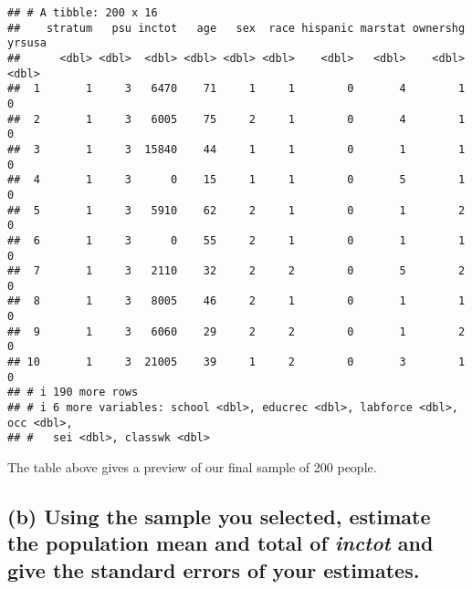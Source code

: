 \documentclass[]{article}
\begin{document}
\begin{verbatim}
## # A tibble: 200 x 16
##    stratum   psu inctot   age   sex  race hispanic marstat ownershg yrsusa
##      <dbl> <dbl>  <dbl> <dbl> <dbl> <dbl>    <dbl>   <dbl>    <dbl>  <dbl>
##  1       1     3   6470    71     1     1        0       4        1      0
##  2       1     3   6005    75     2     1        0       4        1      0
##  3       1     3  15840    44     1     1        0       1        1      0
##  4       1     3      0    15     1     1        0       5        1      0
##  5       1     3   5910    62     2     1        0       1        2      0
##  6       1     3      0    55     2     1        0       1        1      0
##  7       1     3   2110    32     2     2        0       5        2      0
##  8       1     3   8005    46     2     1        0       1        1      0
##  9       1     3   6060    29     2     2        0       1        2      0
## 10       1     3  21005    39     1     2        0       3        1      0
## # i 190 more rows
## # i 6 more variables: school <dbl>, educrec <dbl>, labforce <dbl>, occ <dbl>,
## #   sei <dbl>, classwk <dbl>
\end{verbatim}

The table above gives a preview of our final sample of 200 people.

\subsection{\texorpdfstring{(b) Using the sample you selected, estimate
the population mean and total of \emph{inctot} and give the standard
errors of your
estimates.}{(b) Using the sample you selected, estimate the population mean and total of inctot and give the standard errors of your estimates.}}\label{b-using-the-sample-you-selected-estimate-the-population-mean-and-total-of-inctot-and-give-the-standard-errors-of-your-estimates.}
\end{document}

